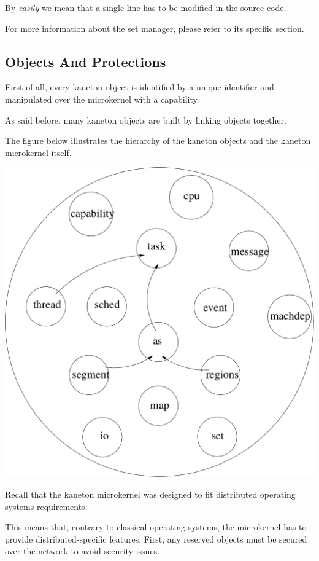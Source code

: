 {\begin{multicols}{2}
By \textit{easily} we mean that a single line has to be modified in the
source code.

For more information about the set manager, please refer to its
specific section.

%
%

\subsection{Objects And Protections}

First of all, every kaneton object is identified by a unique identifier
and manipulated over the microkernel with a capability.

As said before, many kaneton objects are built by linking objects
together.

The figure below illustrates the hierarchy of the kaneton objects
and the kaneton microkernel itself.

\begin{center}
  \includegraphics[scale=0.35]{figures/kaneton.pdf}
\end{center}

Recall that the kaneton microkernel was designed to fit distributed
operating systems requirements.

This means that, contrary to classical operating systems, the microkernel
has to provide distributed-specific features. First, any reserved
objects must be secured over the network to avoid security issues.


\end{multicols}}
